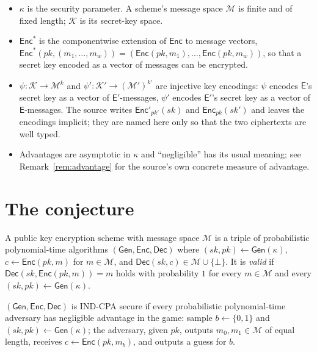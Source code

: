 \documentclass{aicr-conjecture}
\newcommand{\Gen}{\mathsf{Gen}}
\newcommand{\Enc}{\mathsf{Enc}}
\newcommand{\Dec}{\mathsf{Dec}}
\newcommand{\Msp}{\mathcal{M}}
\newcommand{\Ksp}{\mathcal{K}}
\newcommand{\secpar}{\kappa}
\begin{document}
\begin{itemize}
\item $\secpar$ is the security parameter. A scheme's message space
  $\Msp$ is finite and of fixed length; $\Ksp$ is its secret-key space.
\item $\Enc^{*}$ is the componentwise extension of $\Enc$ to message
  vectors, $\Enc^{*}(pk, (m_{1}, \dots, m_{w})) = (\Enc(pk, m_{1}),
  \dots, \Enc(pk, m_{w}))$, so that a secret key encoded as a vector of
  messages can be encrypted.
\item $\psi : \Ksp \to \Msp^{k}$ and $\psi' : \Ksp' \to (\Msp')^{k'}$
  are injective key encodings: $\psi$ encodes $\mathsf{E}$'s secret key
  as a vector of $\mathsf{E}'$-messages, $\psi'$ encodes $\mathsf{E}'$'s
  secret key as a vector of $\mathsf{E}$-messages. The source writes
  $\Enc'_{pk'}(sk)$ and $\Enc_{pk}(sk')$ and leaves the encodings
  implicit; they are named here only so that the two ciphertexts are
  well typed.
\item Advantages are asymptotic in $\secpar$ and ``negligible'' has its
  usual meaning; see Remark~\ref{rem:advantage} for the source's own
  concrete measure of advantage.
\end{itemize}

\section{The conjecture}\label{sec:conjectures}

\begin{definition}\label{def:scheme}
A public key encryption scheme with message space $\Msp$ is a triple of
probabilistic polynomial-time algorithms $(\Gen, \Enc, \Dec)$ where
$(sk, pk) \gets \Gen(\secpar)$, $c \gets \Enc(pk, m)$ for $m \in \Msp$,
and $\Dec(sk, c) \in \Msp \cup \{\bot\}$. It is \emph{valid} if
$\Dec(sk, \Enc(pk, m)) = m$ holds with probability $1$ for every $m \in
\Msp$ and every $(sk, pk) \gets \Gen(\secpar)$.
\end{definition}

\begin{definition}\label{def:indcpa}
$(\Gen, \Enc, \Dec)$ is IND-CPA secure if every probabilistic
polynomial-time adversary has negligible advantage in the game: sample
$b \gets \{0,1\}$ and $(sk, pk) \gets \Gen(\secpar)$; the adversary,
given $pk$, outputs $m_{0}, m_{1} \in \Msp$ of equal length, receives
$c \gets \Enc(pk, m_{b})$, and outputs a guess for $b$.
\end{definition}
\end{document}
